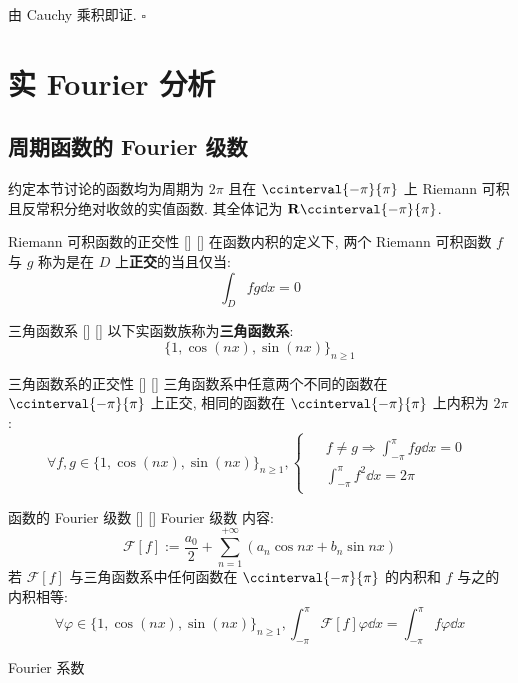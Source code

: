 \documentclass[UTF8]{ctexart}
\begin{document}
			\begin{prf}
				由 Cauchy 乘积即证. 
				\(\square\)
			\end{prf}

	\section{实 Fourier 分析}

		\subsection{周期函数的 Fourier 级数}

			约定本节讨论的函数均为周期为 \(2\pi\) 且在 \(\ccinterval{-\pi}{\pi}\) 上 Riemann 可积且反常积分绝对收敛的实值函数. 其全体记为 \(\mathbf{R}\ccinterval{-\pi}{\pi}\). 
			
			\begin{dfn}
			    []
			    {Riemann 可积函数的正交性}
			    []
			    []
				在函数内积的定义下, 两个 Riemann 可积函数 \(f\) 与 \(g\) 称为是在 \(D\) 上\textbf{正交}的当且仅当: 
				\[\int_D fg\dd x=0\]
			\end{dfn}

			\begin{dfn}
			    []
			    {三角函数系}
			    []
			    []
				以下实函数族称为\textbf{三角函数系}: 
				\[{\{1,\cos(nx),\sin(nx)\}}_{n\geq 1}\]
			\end{dfn}
			
			\begin{ppt}
			    []
			    {三角函数系的正交性}
			    []
			    []
				三角函数系中任意两个不同的函数在 \(\ccinterval{-\pi}{\pi}\) 上正交, 相同的函数在 \(\ccinterval{-\pi}{\pi}\) 上内积为 \(2\pi\): 
				\[\forall f,g\in{\{1,\cos(nx),\sin(nx)\}}_{n\geq 1}, 
				\begin{cases}
					\begin{aligned}
						&f\neq g \Longrightarrow\int_{-\pi}^{\pi}fg\dd x=0\\
						&\int_{-\pi}^{\pi}f^2\dd x=2\pi
					\end{aligned}
				\end{cases}\]
			\end{ppt}

			\begin{dfn}
			    []
			    {函数的 Fourier 级数}
			    []
			    []
			{}
			{Fourier 级数}
			{}
			{}
				内容: 
				\[\mathcal{F}[f]:=\frac{a_0}{2}+\sum_{n=1}^{+\infty}(a_n\cos nx+b_n\sin nx)\]
				若 \(\mathcal{F}[f]\) 与三角函数系中任何函数在 \(\ccinterval{-\pi}{\pi}\) 的内积和 \(f\) 与之的内积相等: 
				\[\forall\varphi\in{\{1,\cos(nx),\sin(nx)\}}_{n\geq 1}, \int_{-\pi}^{\pi}\mathcal{F}[f]\varphi\dd x=\int_{-\pi}^{\pi}f\varphi\dd x\]

			    {}
			    {Fourier 系数}
			    {}
			    {}
			\end{dfn}
\end{document}
